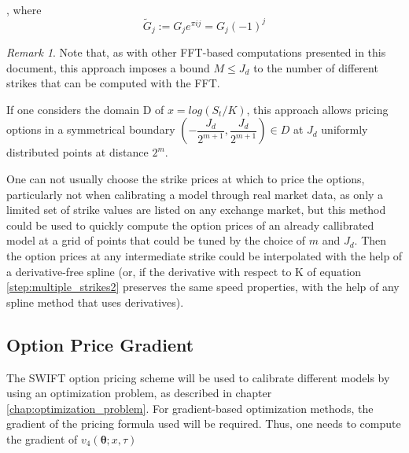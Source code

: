 \documentclass[12,twoside]{mammeTFM}
\theoremstyle{definition}
\theoremstyle{remark}
\newtheorem{remark}[thm]{Remark}
\begin{document}
\begin{itemize}
\begin{equation}
\begin{aligned}
\end{aligned}
\end{equation}
, where 
\begin{equation}
\tilde{G}_j := G_j e^{\pi i j} = G_j (-1)^j
\end{equation}
\begin{remark}
Note that, as with other FFT-based computations presented in this document, this approach imposes a bound $M \leq J_d$ to the number of different strikes that can be computed with the FFT.
\end{remark}
If one considers the domain D of $x = log(S_t/K)$, this approach allows pricing options in a symmetrical boundary $(-\dfrac{J_d}{2^{m+1}},\dfrac{J_d}{2^{m+1}}) \in D$ at $J_d$ uniformly distributed points at distance $2^m$.

One can not usually choose the strike prices at which to price the options, particularly not when calibrating a model through real market data, as only a limited set of strike values are listed on any exchange market, but this method could be used to quickly compute the option prices of an already callibrated model at a grid of points that could be tuned by the choice of $m$ and $J_d$. Then the option prices at any intermediate strike could be interpolated with the help of a derivative-free spline (or, if the derivative with respect to K of equation \ref{step:multiple_strikes2} preserves the same speed properties, with the help of any spline method that uses derivatives).
\end{itemize}

\subsection{Option Price Gradient}\label{subsec:gradient}

The SWIFT option pricing scheme will be used to calibrate different models by using an optimization problem, as described in chapter \ref{chap:optimization_problem}. For gradient-based optimization methods, the gradient of the pricing formula used will be required. Thus, one needs to compute the gradient of $v_4(\boldsymbol{\theta}; x, \tau)$
\end{document}

